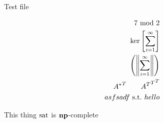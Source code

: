 \documentclass[12pt]{article}
\begin{document}
Test file

\begin{align*}
  {7\ \mathrm{mod}\ 2} \\
  {\mathrm{ker}\left[\sum_{i = 1}^\infty\right]} \\
  {\left({\left\lVert\sum_{i = 1}^\infty\right\rVert}\right)} \\
  {{A^{\ast}}^{T}} \qquad {{{A^{T}}^{T}}^{T}} \\
  asfsadf {\ \mathrm{s.t.}\ } hello \\
\end{align*}

This thing ${\text{sat}}$ is ${\mathbf{np}}$-complete
\end{document}
